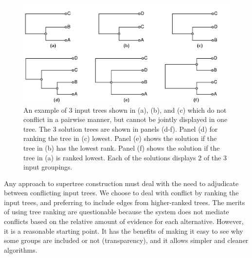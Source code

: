 \documentclass[fleqn,12pt,lineno,english]{wlpeerj}
\providecommand{\DIFaddbeginFL}{} %
\providecommand{\DIFaddendFL}{} %
\providecommand{\DIFdelbeginFL}{} %
\providecommand{\DIFdelendFL}{} %
\begin{document}
\begin{figure}
\DIFdelbeginFL %







\DIFdelendFL \DIFaddbeginFL \includegraphics[width=1.0\textwidth]{Fig2}
\DIFaddendFL 

\caption{An example of 3 input trees shown in (a), (b), and (c) which do not
conflict in a pairwise manner, but cannot be jointly displayed in
one tree. The 3 solution trees are shown in panels (d-f). Panel (d)
for ranking the tree in (c) lowest. Panel (e) shows the solution if
the tree in (b) has the lowest rank. Panel (f) shows the solution
if the tree in (a) is ranked lowest. Each of the solutions displays
2 of the 3 input groupings. }

\label{fig:pairwisecompat}
\end{figure}

Any approach to supertree construction must deal with the need to
adjudicate between conflicting input trees. We choose to deal with
conflict by ranking the input trees, and preferring to include edges
from higher-ranked trees. The merits of using tree ranking are questionable
because the system does not mediate conflicts based on the relative
amount of evidence for each alternative. However, it is a reasonable
starting point. It has the benefits of making it easy to see why some
groups are included or not (transparency), and it allows simpler and
cleaner algorithms.
\end{document}
